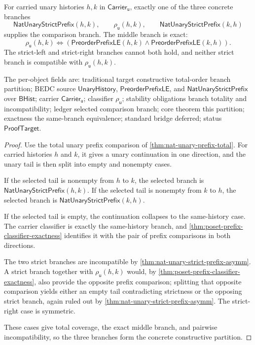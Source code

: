 \begin{theorem}
\label{thm:concrete-unary-prefix-totalorder-comparison-partition}
For carried unary histories $h,k$ in
$\mathsf{Carrier}_{\mathsf{u}}$, exactly one of the three concrete branches
$$
\mathsf{NatUnaryStrictPrefix}(h,k),
\qquad
\rho_{\mathsf{u}}(h,k),
\qquad
\mathsf{NatUnaryStrictPrefix}(k,h)
$$
supplies the comparison branch. The middle branch is exact:
$$
\rho_{\mathsf{u}}(h,k)\Longleftrightarrow
(\mathsf{PreorderPrefixLE}(h,k)\land\mathsf{PreorderPrefixLE}(k,h)).
$$
The strict-left and strict-right branches cannot both hold, and neither strict
branch is compatible with $\rho_{\mathsf{u}}(h,k)$.

The per-object fields are: traditional target constructive total-order branch
partition; BEDC source $\mathsf{UnaryHistory}$, $\mathsf{PreorderPrefixLE}$, and
$\mathsf{NatUnaryStrictPrefix}$ over $\mathsf{BHist}$; carrier
$\mathsf{Carrier}_{\mathsf{u}}$; classifier $\rho_{\mathsf{u}}$; stability
obligations branch totality and incompatibility; ledger selected comparison
branch; core theorem this partition; exactness the same-branch equivalence;
standard bridge deferred; status $\mathsf{ProofTarget}$.
\end{theorem}
\begin{proof}
Use the total unary prefix comparison of
\autoref{thm:nat-unary-prefix-total}. For carried histories $h$ and $k$, it gives
a unary continuation in one direction, and the unary tail is then split into
empty and nonempty cases.

If the selected tail is nonempty from $h$ to $k$, the selected branch is
$\mathsf{NatUnaryStrictPrefix}(h,k)$. If the selected tail is nonempty from $k$
to $h$, the selected branch is $\mathsf{NatUnaryStrictPrefix}(k,h)$.

If the selected tail is empty, the continuation collapses to the same-history
case. The carrier classifier is exactly the same-history branch, and
\autoref{thm:poset-prefix-classifier-exactness} identifies it with the pair of
prefix comparisons in both directions.

The two strict branches are incompatible by
\autoref{thm:nat-unary-strict-prefix-asymm}. A strict branch together with
$\rho_{\mathsf{u}}(h,k)$ would, by
\autoref{thm:poset-prefix-classifier-exactness}, also provide the opposite
prefix comparison; splitting that opposite comparison yields either an empty
tail contradicting strictness or the opposing strict branch, again ruled out by
\autoref{thm:nat-unary-strict-prefix-asymm}. The strict-right case is symmetric.

These cases give total coverage, the exact middle branch, and pairwise
incompatibility, so the three branches form the concrete constructive
partition.
\end{proof}

